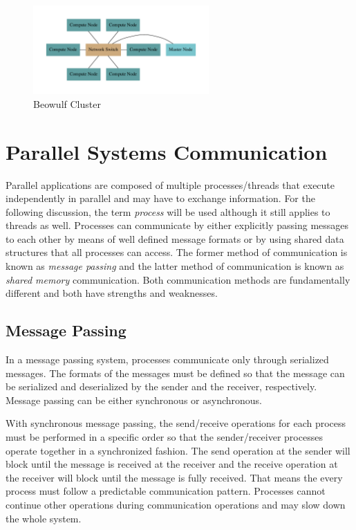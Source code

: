 \documentclass[11pt]{book}
\begin{document}
\begin{figure}
  \centering
  \includegraphics[width=0.6\textwidth,quiet]{figs/graphviz/beowulf.pdf}
  \caption{Beowulf Cluster}\label{beowulf}
\end{figure}

\section{Parallel Systems Communication}

Parallel applications are composed of multiple processes/threads that execute independently in
parallel and may have to exchange information.  For the following discussion, the term \emph{process}
will be used although it still applies to threads as well.  Processes can communicate by either
explicitly passing messages to each other by means of well defined message formats or by using
shared data structures that all processes can access.  The former method of communication is known
as \emph{message passing} and the latter method of communication is known as \emph{shared memory}
communication.  Both communication methods are fundamentally different and both have strengths and
weaknesses.

\subsection{Message Passing}

In a message passing system, processes communicate only through serialized messages.  The formats of
the messages must be defined so that the message can be serialized and deserialized by the sender
and the receiver, respectively.  Message passing can be either synchronous or asynchronous.

With synchronous message passing, the send/receive operations for each process must be performed in
a specific order so that the sender/receiver processes operate together in a synchronized fashion.
The send operation at the sender will block until the message is received at the receiver and the
receive operation at the receiver will block until the message is fully received.  That means the
every process must follow a predictable communication pattern.  Processes cannot continue other
operations during communication operations and may slow down the whole system.
\end{document}
